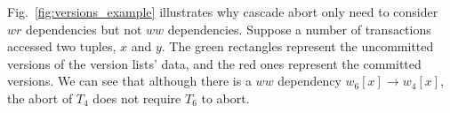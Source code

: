 \documentclass[conference]{IEEEtran}
\begin{document}
Fig.~\ref{fig:versions_example} illustrates why cascade abort only need to consider $wr$ dependencies but not $ww$ dependencies. 
Suppose a number of transactions accessed two tuples, ${x}$ and ${y}$.
The green rectangles represent the uncommitted versions of the version lists' data, and the red ones represent the committed versions.
We can see that although there is a ${ww}$ dependency ${w_6[x] \rightarrow w_4[x]}$,
the abort of $T_4$ does not require ${T_6}$ to abort.
\begin{figure}[tbp]
  \centering

\end{figure}
\end{document}
